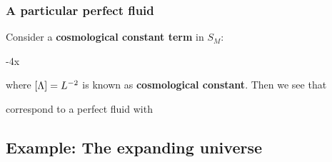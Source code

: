 \documentclass[../main/main.tex]{subfiles}
\begin{document}
\subsubsection{A particular perfect fluid}

Consider a \textbf{cosmological constant term} in $S_M$:
\begin{eqalign}
	-\frac\Lambda \kappa\int\diff4x
\end{eqalign}
where $\left[\Lambda\right] = L^{-2}$ is known as \textbf{cosmological constant}. Then we see that
\begin{eqalign}\boxed{
	\imet\mu\nu_\Lambda = -\frac\Lambda \kappa\imet\mu\nu
}\end{eqalign}
correspond to a perfect fluid with
\begin{eqalign}\boxed{
	\epsilon = \frac\Lambda \kappa
}\end{eqalign}

\subsection{Example: The expanding universe}
\end{document}
